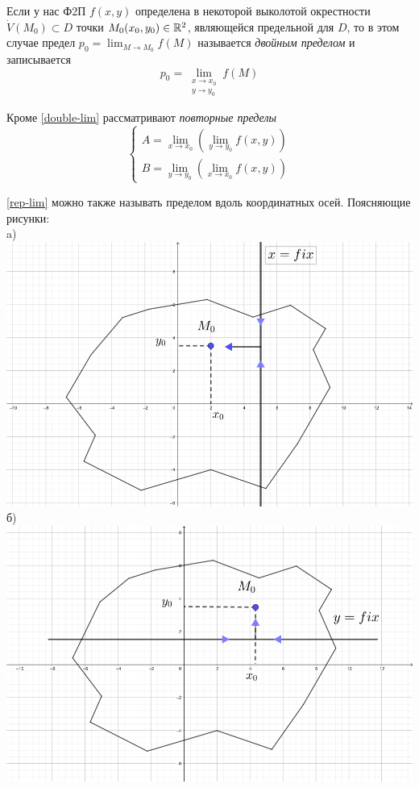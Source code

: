 \documentclass[../../main.tex]{subfiles}
\begin{document}
Если у нас Ф2П $f(x, y)$ определена в некоторой выколотой окрестности 
$\dot{V}(M_0) \subset D$ точки $M_0(x_0, y_0) \in \mathbb{R}^2$,
являющейся предельной для $D$, то в этом случае  предел
$p_0 = \displaystyle \lim_{M \to M_0}{f(M)}$ называется
\emph{двойным пределом} и записывается 
\begin{equation}
\label{double-lim}
p_0 = \underset{\substack{
	x \to x_0 \\
	y \to y_0
}}{\lim}f(M)
\end{equation}

Кроме \eqref{double-lim} рассматривают \emph{повторные пределы}
\begin{equation}
\label{rep-lim}
	\left\{\begin{aligned}
		A = \displaystyle\lim_{x \to x_0}{(\lim_{y \to y_0}{f(x, y)})} \\
		B = \displaystyle\lim_{y \to y_0}{(\lim_{x \to x_0}{f(x, y)})} 
	\end{aligned}\right.
\end{equation}

\eqref{rep-lim} можно также называть пределом вдоль координатных осей.
Поясняющие рисунки: \\
a) 
\includegraphics[scale=1.0]{rep-lim-case-a.png}
б) 
\includegraphics[scale=1.0]{rep-lim-case-b.png}
\end{document}
